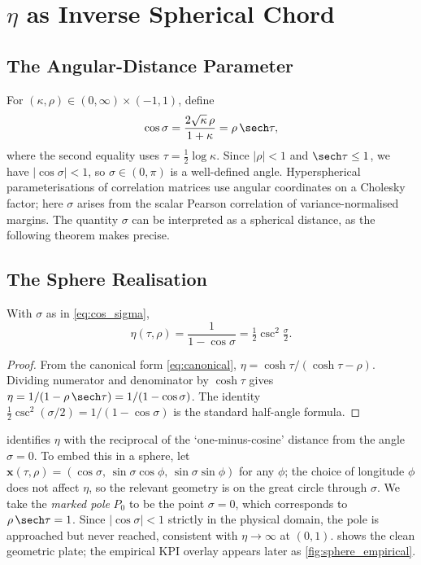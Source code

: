 \section{\texorpdfstring{$\eta$}{eta} as Inverse Spherical Chord}
\label{sec:sphere}

\subsection{The Angular-Distance Parameter}

For $(\kappa,\rho) \in (0,\infty)\times(-1,1)$, define
\begin{equation}
  \cos\sigma
  = \frac{2\sqrt{\kappa}\,\rho}{1+\kappa}
  = \rho\,\sech\tau,
  \label{eq:cos_sigma}
\end{equation}
where the second equality uses $\tau = \tfrac{1}{2}\log\kappa$.  Since $|\rho| < 1$ and $\sech\tau \le 1$, we have $|\cos\sigma| < 1$, so $\sigma \in (0,\pi)$ is a well-defined angle.  Hyperspherical parameterisations of correlation matrices \parencite{joe2006} use angular coordinates on a Cholesky factor; here $\sigma$ arises from the scalar Pearson correlation of variance-normalised margins.  The quantity $\sigma$ can be interpreted as a spherical distance, as the following theorem makes precise.

\subsection{The Sphere Realisation}

\begin{theorem}
\label{thm:sphere}
With $\sigma$ as in \cref{eq:cos_sigma},
\begin{equation}
  \eta(\tau,\rho)
  = \frac{1}{1 - \cos\sigma}
  = \tfrac{1}{2}\csc^{2}\!\tfrac{\sigma}{2}.
  \label{eq:eta_sphere}
\end{equation}
\end{theorem}

\begin{proof}
From the canonical form \cref{eq:canonical},
$\eta = \cosh\tau/(\cosh\tau - \rho)$.
Dividing numerator and denominator by $\cosh\tau$ gives $\eta = 1/(1-\rho\,\sech\tau) = 1/(1-\cos\sigma)$.
The identity $\tfrac{1}{2}\csc^{2}(\sigma/2) = 1/(1-\cos\sigma)$ is the standard half-angle formula.
\end{proof}

 identifies $\eta$ with the reciprocal of the `one-minus-cosine' distance from the angle $\sigma = 0$.  To embed this in a sphere, let $\mathbf{x}(\tau,\rho) = (\cos\sigma,\, \sin\sigma\cos\phi,\, \sin\sigma\sin\phi)$ for any $\phi$; the choice of longitude $\phi$ does not affect $\eta$, so the relevant geometry is on the great circle through $\sigma$.  We take the \emph{marked pole} $P_{0}$ to be the point $\sigma = 0$, which corresponds to $\rho\,\sech\tau = 1$.  Since $|\cos\sigma| < 1$ strictly in the physical domain, the pole is approached but never reached, consistent with $\eta \to \infty$ at $(0,1)$.   shows the clean geometric plate; the empirical KPI overlay appears later as \cref{fig:sphere_empirical}.

